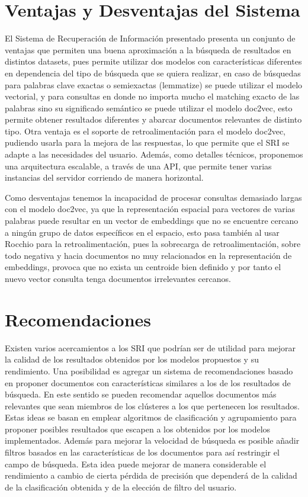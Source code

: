 \documentclass[12pt]{llncs}
\begin{document}
\section{Ventajas y Desventajas del Sistema}

El Sistema de Recuperación de Información presentado presenta un conjunto de ventajas que permiten una buena aproximación a la búsqueda de resultados en distintos datasets, pues permite utilizar dos modelos con características diferentes en dependencia del tipo de búsqueda que se quiera realizar, en caso de búsquedas para palabras clave exactas o semiexactas (lemmatize) se puede utilizar el modelo vectorial, y para consultas en donde no importa mucho el matching exacto de las palabras sino su significado semántico se puede utilizar el modelo doc2vec, esto permite obtener resultados diferentes y abarcar documentos relevantes de distinto tipo. Otra ventaja es el soporte de retroalimentación para el modelo doc2vec, pudiendo usarla para la mejora de las respuestas, lo que permite que el SRI se adapte a las necesidades del usuario. Además, como detalles técnicos, proponemos una arquitectura escalable, a través de una API, que permite tener varias instancias del servidor corriendo de manera horizontal.

Como desventajas tenemos la incapacidad de procesar consultas demasiado largas con el modelo doc2vec, ya que la representación espacial para vectores de varias palabras puede resultar en un vector de embeddings que no se encuentre cercano a ningún grupo de datos específicos en el espacio, esto pasa también al usar Rocchio para la retroalimentación, pues la sobrecarga de retroalimentación, sobre todo negativa y hacia documentos no muy relacionados en la representación de embeddings, provoca que no exista un centroide bien definido y por tanto el nuevo vector consulta tenga documentos irrelevantes cercanos.

\section*{Recomendaciones}

Existen varios acercamientos a los SRI que podrían ser de utilidad para mejorar la calidad de los resultados obtenidos por los modelos propuestos y su rendimiento. Una posibilidad es agregar un sistema de recomendaciones basado en proponer documentos con características similares a los de los resultados de búsqueda. En este sentido se pueden recomendar aquellos documentos más relevantes que sean miembros de los clústeres a los que pertenecen los resultados. Estas ideas se basan en emplear algoritmos de clasificación y agrupamiento para proponer posibles resultados que escapen a los obtenidos por los modelos implementados. Además para mejorar la velocidad de búsqueda es posible añadir filtros basados en las características de los documentos para así restringir el campo de búsqueda. Esta idea puede mejorar de manera considerable el rendimiento a cambio de cierta pérdida de precisión que dependerá de la calidad de la clasificación obtenida y de la elección de filtro del usuario.


 

\end{document}
